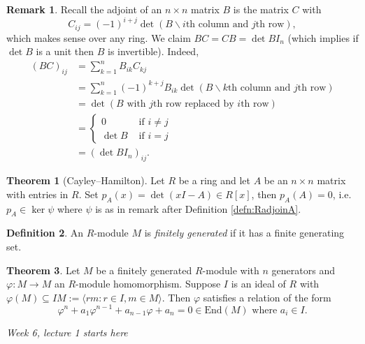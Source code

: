 \documentclass[a4paper]{article}
\newcommand{\la}{\langle}
\newcommand{\ra}{\rangle}
\newcommand{\End}{\text{End}}
\theoremstyle{definition}
\newtheorem{defn}{Definition}[subsection]
\newtheorem{thm}[defn]{Theorem}
\newtheorem*{remark}{Remark}
\begin{document}
\begin{remark}
Recall the adjoint of an $n\times n$ matrix $B$ is the matrix $C$ with 
\[
C_{ij}=(-1)^{i+j} \det \left(B\backslash i\text{th column and }j\text{th row} \right),
\]
which makes sense over any ring. We claim $BC=CB=\det B I_n$ (which implies if $\det B$ is a unit then $B$ is invertible). Indeed,
\[
\begin{aligned}
(BC)_{ij} &= \sum_{k=1}^n B_{ik} C_{kj}\\
&=\sum_{k=1}^n (-1)^{k+j} B_{ik} \det \left(B\backslash k\text{th column and }j\text{th row} \right)\\
&=\det \left(B\text{ with }j\text{th row replaced by }i\text{th row}\right)\\
&=\left\{ \begin{aligned}
  0 &\text{ if } i\neq j\\ \det B &\text{ if } i= j
\end{aligned} \right. \\
&=\left(\det B I_n\right)_{ij}.
\end{aligned}
\]
\end{remark}

\begin{thm}[Cayley–Hamilton]
Let $R$ be a ring and let $A$ be an $n\times n$ matrix with entries in $R$. Set $p_A(x)=\det (xI-A)\in R[x]$, then $p_A(A)=0$, i.e. $p_A\in\ker\psi$ where $\psi$ is as in remark after Definition \ref{defn:RadjoinA}.
\end{thm}

\begin{defn}
An $R$-module $M$ is \textit{finitely generated} if it has a finite generating set.
\end{defn}

\begin{thm}
\label{thm:generalCH}
Let $M$ be a finitely generated $R$-module with $n$ generators and $\varphi:M\rightarrow M$ an $R$-module homomorphism. Suppose $I$ is an ideal of $R$ with $\varphi(M)\subseteq IM:=\la rm:r\in I,m\in M\ra$. Then $\varphi$ satisfies a relation of the form
\[
\varphi^n + a_1 \varphi^{n-1} + a_{n-1}\varphi + a_n=0 \in\End(M) \text{ where } a_i\in I.
\]
\end{thm}

\begin{flushright}
\textit{Week 6, lecture 1 starts here}
\end{flushright}
\end{document}

